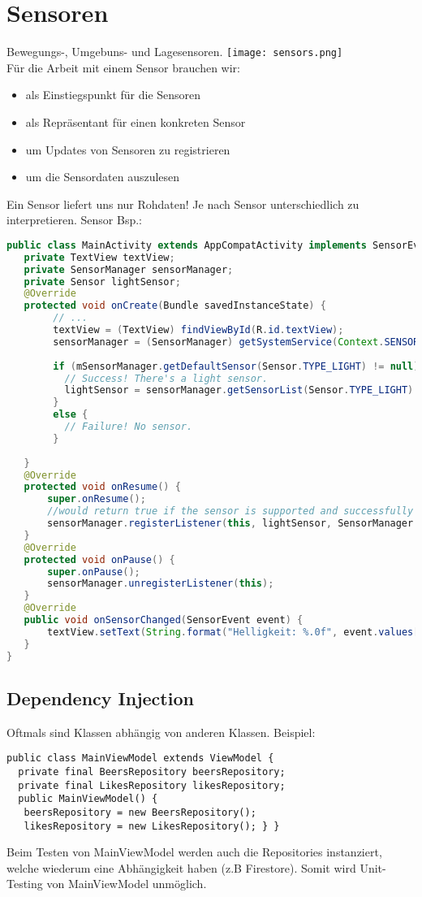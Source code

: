 \section{Sensoren}
Bewegungs-, Umgebuns- und Lagesensoren.
\texttt{[image: sensors.png]} \\
Für die Arbeit mit einem Sensor brauchen wir:
\begin{itemize}
\item {} als Einstiegspunkt für die Sensoren
\item {} als Repräsentant für einen konkreten Sensor
\item {} um Updates von Sensoren zu registrieren
\item {} um die Sensordaten auszulesen
\end{itemize}
Ein Sensor liefert uns nur Rohdaten! Je nach Sensor unterschiedlich zu interpretieren. Sensor Bsp.:
\begin{lstlisting}[language=java]
public class MainActivity extends AppCompatActivity implements SensorEventListener {
   private TextView textView;
   private SensorManager sensorManager;
   private Sensor lightSensor;
   @Override
   protected void onCreate(Bundle savedInstanceState) {
        // ...
        textView = (TextView) findViewById(R.id.textView);
        sensorManager = (SensorManager) getSystemService(Context.SENSOR_SERVICE);
       
        if (mSensorManager.getDefaultSensor(Sensor.TYPE_LIGHT) != null){
          // Success! There's a light sensor.
          lightSensor = sensorManager.getSensorList(Sensor.TYPE_LIGHT).get(0);
        }
        else {
          // Failure! No sensor.
        }
        
   }
   @Override
   protected void onResume() {
       super.onResume();
       //would return true if the sensor is supported and successfully enabled.
       sensorManager.registerListener(this, lightSensor, SensorManager.SENSOR_DELAY_NORMAL);
   }
   @Override
   protected void onPause() {
       super.onPause();
       sensorManager.unregisterListener(this);
   }
   @Override
   public void onSensorChanged(SensorEvent event) {
       textView.setText(String.format("Helligkeit: %.0f", event.values[0]));
   }
}
\end{lstlisting}
\subsection{Dependency Injection}
Oftmals sind Klassen abhängig von anderen Klassen. Beispiel:
\begin{lstlisting}
public class MainViewModel extends ViewModel {
  private final BeersRepository beersRepository;
  private final LikesRepository likesRepository;
  public MainViewModel() {
   beersRepository = new BeersRepository();
   likesRepository = new LikesRepository(); } }
\end{lstlisting}
Beim Testen von MainViewModel werden auch die Repositories instanziert,  welche wiederum eine Abhängigkeit haben (z.B Firestore). Somit wird Unit-Testing von MainViewModel unmöglich. \\
